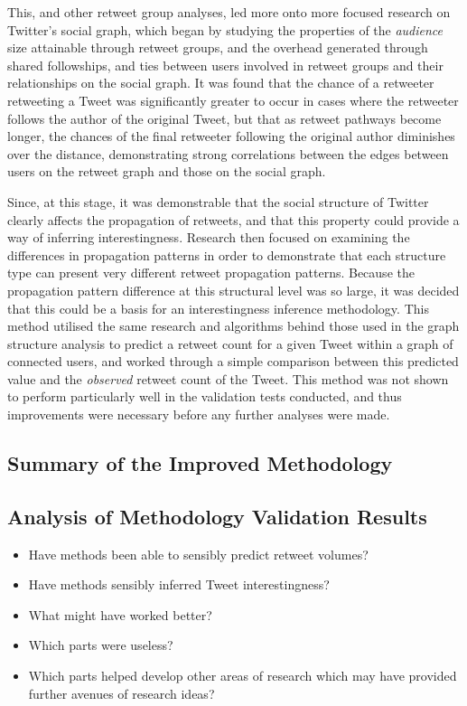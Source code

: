 This, and other retweet group analyses, led more onto more focused research on Twitter's social graph, which began by studying the properties of the \textit{audience} size attainable through retweet groups, and the overhead generated through shared followships, and ties between users involved in retweet groups and their relationships on the social graph. It was found that the chance of a retweeter retweeting a Tweet was significantly greater to occur in cases where the retweeter follows the author of the original Tweet, but that as retweet pathways become longer, the chances of the final retweeter following the original author diminishes over the distance, demonstrating strong correlations between the edges between users on the retweet graph and those on the social graph.

Since, at this stage, it was demonstrable that the social structure of Twitter clearly affects the propagation of retweets, and that this property could provide a way of inferring interestingness. Research then focused on examining the differences in propagation patterns in order to demonstrate that each structure type can present very different retweet propagation patterns. Because the propagation pattern difference at this structural level was so large, it was decided that this could be a basis for an interestingness inference methodology. This method utilised the same research and algorithms behind those used in the graph structure analysis to predict a retweet count for a given Tweet within a graph of connected users, and worked through a simple comparison between this predicted value and the \textit{observed} retweet count of the Tweet. This method was not shown to perform particularly well in the validation tests conducted, and thus improvements were necessary before any further analyses were made.


\subsection{Summary of the Improved Methodology}



\subsection{Analysis of Methodology Validation Results}

\begin{itemize}
\item Have methods been able to sensibly predict retweet volumes?
\item Have methods sensibly inferred Tweet interestingness?
\item What might have worked better?
\item Which parts were useless?
\item Which parts helped develop other areas of research which may have provided further avenues of research ideas?
\end{itemize}




